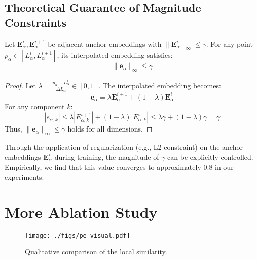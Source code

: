 \subsection{Theoretical Guarantee of Magnitude Constraints}
\label{subsec:theorem}
\begin{theorem}
\label{thm:anchor}
Let $\mathbf{E}_\alpha^i, \mathbf{E}_\alpha^{i+1}$ be adjacent anchor embeddings with $\|\mathbf{E}_\alpha^i\|_\infty \leq \gamma$. For any point $p_\alpha \in [L_\alpha^i, L_\alpha^{i+1}]$, its interpolated embedding satisfies:
\begin{equation}
    \| \mathbf{e}_\alpha \|_\infty \leq \gamma
\end{equation}
\end{theorem}

\begin{proof}
Let $\lambda = \frac{p_\alpha - L_\alpha^i}{\Delta L_\alpha} \in [0, 1]$. The interpolated embedding becomes:
\begin{equation}
    \mathbf{e}_\alpha = \lambda \mathbf{E}_\alpha^{i+1} + (1 - \lambda) \mathbf{E}_\alpha^i
\end{equation}
For any component $k$:
\begin{equation}
    |e_{\alpha,k}| \leq \lambda |E_{\alpha,k}^{i+1}| + (1 - \lambda) |E_{\alpha,k}^i| \leq \lambda \gamma + (1 - \lambda) \gamma = \gamma
\end{equation}
Thus, $\|\mathbf{e}_\alpha\|_\infty \leq \gamma$ holds for all dimensions.
\end{proof}
Through the application of regularization (e.g., L2 constraint) on the anchor embeddings $\mathbf{E}_\alpha^i$
during training, the magnitude of $\gamma$ can be explicitly controlled.
Empirically, we find that this value converges to approximately 0.8 in our experiments.


\section{More Ablation Study}\label{sec:more_ablation}

\begin{figure*}[htb]
\centering
	\texttt{[image: ./figs/pe\_visual.pdf]}
	\caption{Qualitative comparison of the local similarity.}
	\label{fig:pe_visual_compare}
\end{figure*}

